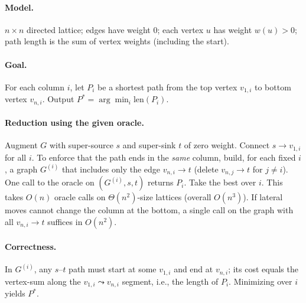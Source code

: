 \documentclass[11pt]{article}
\theoremstyle{definition}
\theoremstyle{remark}
\begin{document}
\paragraph{Model.} $n\times n$ directed lattice; edges have weight $0$; each vertex $u$ has weight $w(u)>0$; path length is the sum of vertex weights (including the start).

\paragraph{Goal.} For each column $i$, let $P_i$ be a shortest path from the top vertex $v_{1,i}$ to bottom vertex $v_{n,i}$. Output $P^\ast=\arg\min_i \mathrm{len}(P_i)$.

\paragraph{Reduction using the given oracle.}
Augment $G$ with super-source $s$ and super-sink $t$ of zero weight. Connect $s\to v_{1,i}$ for all $i$. To enforce that the path ends in the \emph{same} column, build, for each fixed $i$, a graph $G^{(i)}$ that includes only the edge $v_{n,i}\to t$ (delete $v_{n,j}\to t$ for $j\neq i$). One call to the oracle on $(G^{(i)},s,t)$ returns $P_i$. Take the best over $i$. This takes $O(n)$ oracle calls on $\Theta(n^2)$-size lattices (overall $O(n^3)$). If lateral moves cannot change the column at the bottom, a single call on the graph with all $v_{n,i}\to t$ suffices in $O(n^2)$.

\paragraph{Correctness.} In $G^{(i)}$, any $s$–$t$ path must start at some $v_{1,i}$ and end at $v_{n,i}$; its cost equals the vertex-sum along the $v_{1,i}\leadsto v_{n,i}$ segment, i.e., the length of $P_i$. Minimizing over $i$ yields $P^\ast$.
\end{document}
